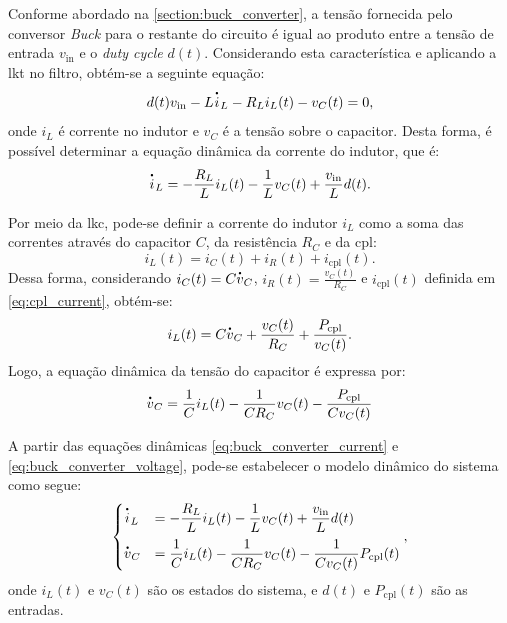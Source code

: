 Conforme abordado na \autoref{section:buck_converter}, a tensão fornecida pelo conversor \textit{Buck} para o restante do circuito é igual ao produto entre a tensão de entrada $v_{\mathrm{in}}$ e o \textit{duty cycle }$d(t)$. Considerando esta característica e aplicando a \acrfull{lkt} no filtro, obtém-se a seguinte equação: \begin{equation} d(t)v_{\mathrm{in}} - L \dt{i}_L - R_L i_L(t) - v_C(t) = 0, \end{equation} onde $i_L$ é corrente no indutor e $v_C$ é a tensão sobre o capacitor. Desta forma, é possível determinar a equação dinâmica da corrente do indutor, que é: \begin{equation} \dt{i}_L = - \frac{R_L}{L} i_L(t) - \frac{1}{L} v_C(t) + \frac{v_{\mathrm{in}}}{L}d(t). \label{eq:buck_converter_current} \end{equation}

Por meio da \acrfull{lkc}, pode-se definir a corrente do indutor $i_{L}$ como a soma das correntes através do capacitor $C$, da resistência $R_C$ e da \acrshort{cpl}: \begin{equation} i_L(t) = i_C(t) + i_R(t) + i_{\mathrm{cpl}}(t). \end{equation} Dessa forma, considerando $i_C(t) = C\dt{v}_C$, $i_R(t) = \frac{v_C(t)}{R_C}$ e $i_{\mathrm{cpl}}(t)$ definida em \eqref{eq:cpl_current}, obtém-se: \begin{equation} i_L(t) = C\dt{v}_C + \frac{v_C(t)}{R_C} + \frac{P_{\mathrm{cpl}}}{v_C(t)}. \end{equation} Logo, a equação dinâmica da tensão do capacitor é expressa por: \begin{equation} \dt{v}_C = \frac{1}{C} i_L(t) - \frac{1}{CR_C}v_C(t) - \frac{P_{\mathrm{cpl}}}{Cv_C(t)} \label{eq:buck_converter_voltage} \end{equation}

A partir das equações dinâmicas \eqref{eq:buck_converter_current} e \eqref{eq:buck_converter_voltage}, pode-se estabelecer o modelo dinâmico do sistema como segue: \begin{equation}\begin{cases} \dt{i}_L &= \displaystyle - \frac{R_L}{L} i_L(t) - \frac{1}{L} v_C(t) + \frac{v_{\mathrm{in}}}{L}d(t)  \\[8pt] \dt{v}_C &= \displaystyle \frac{1}{C} i_L(t) - \frac{1}{C R_C} v_C(t) - \frac{1}{C v_C(t)} P_{\mathrm{cpl}}(t) \label{eq:buck_nonlinear_system} \end{cases}, \end{equation} onde $i_L(t)$ e $v_C(t)$ são os estados do sistema, e $d(t)$ e $P_{\mathrm{cpl}}(t)$ são as entradas.

